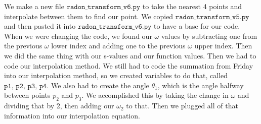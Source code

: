 
We make a new file $\texttt{radon\_transform\_v6.py}$ to take the nearest 4 points and interpolate between them to find our point. We copied $\texttt{radon\_transform\_v5.py}$ and then pasted it into $\texttt{radon\_transform\_v6.py}$ to have a base for our code. \\
When we were changing the code, we found our $\omega$ values by subtracting one from the previous $\omega$ lower index and adding one to the previous $\omega$ upper index. Then we did the same thing with our s-values and our function values. Then we had to code our interpolation method. We still had to code the summation from Friday into our interpolation method, so we created variables to do that, called $\texttt{p1, p2, p3, p4}$. We also had to create the angle $\theta_1$, which is the angle halfway between points $p_2$ and $p_3$. We accomplished this by taking the change in $\omega$ and dividing that by 2, then adding our $\omega_2$ to that. Then we plugged all of that information into our interpolation equation.